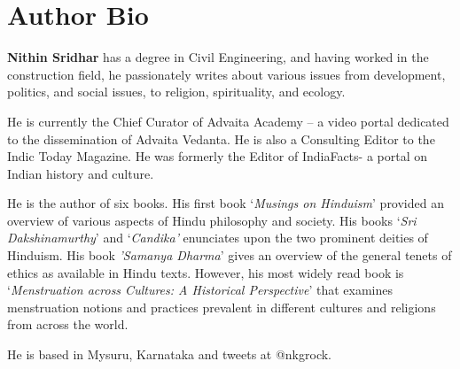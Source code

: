 \chapter{\textbf{Author Bio}}

\textbf{Nithin Sridhar} has a degree in Civil Engineering, and having worked in the construction field, he passionately writes about various issues from development, politics, and social issues, to religion, spirituality, and ecology.

He is currently the Chief Curator of Advaita Academy -- a video portal dedicated to the dissemination of Advaita Vedanta. He is also a Consulting Editor to the Indic Today Magazine. He was formerly the Editor of IndiaFacts- a portal on Indian history and culture.

He is the author of six books. His first book `\emph{Musings on Hinduism}' provided an overview of various aspects of Hindu philosophy and society. His books `\emph{Sri Dakshinamurthy}' and `\emph{Candika'} enunciates upon the two prominent deities of Hinduism. His book \emph{'Samanya Dharma}' gives an overview of the general tenets of ethics as available in Hindu texts. However, his most widely read book is `\emph{Menstruation across Cultures: A Historical Perspective}' that examines menstruation notions and practices prevalent in different cultures and religions from across the world.

He is based in Mysuru, Karnataka and tweets at @nkgrock.

